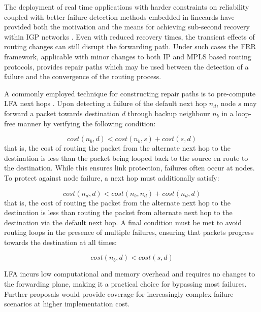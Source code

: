 The deployment of real time applications with harder constraints on reliability coupled with better failure detection methods embedded in linecards have provided both the motivation and the means for achieving sub-second recovery within \ac{IGP} networks \cite{Francois:2005p514}.
Even with reduced recovery times, the transient effects of routing changes can still disrupt the forwarding path.
Under such cases the \ac{FRR} framework, applicable with minor changes to both \ac{IP} \cite{Shand:2010p516} and \ac{MPLS} \cite{Pan:2005p517} based routing protocols, provides repair paths which may be used between the detection of a failure and the convergence of the routing process.

A commonly employed technique for constructing repair paths is to pre-compute \ac{LFA} next hops \cite{Torvi:2008p518}.
Upon detecting a failure of the default next hop $n_d$, node $s$ may forward a packet towards destination $d$ through backup neighbour $n_b$ in a loop-free manner by verifying the following condition:

\begin{equation}
cost \left (n_b, d \right) < cost \left(n_b, s \right) + cost \left(s, d \right) 
\label{eqn:linkprotection}
\end{equation}
that is, the cost of routing the packet from the alternate next hop to the destination is less than the packet being looped back to the source en route to the destination.
While this ensures link protection, failures often occur at nodes. To protect against node failure, a next hop must additionally satisfy:

\begin{equation}
cost \left (n_d, d \right) < cost \left(n_b, n_d \right) + cost \left(n_d, d \right) 
\label{eqn:nodeprotection}
\end{equation}
that is, the cost of routing the packet from the alternate next hop to the destination is less than routing the packet from alternate next hop to the destination via the default next hop.
A final condition must be met to avoid routing loops in the presence of multiple failures, ensuring that packets progress towards the destination at all times:

\begin{equation}
cost \left (n_b, d \right) < cost \left(s, d \right)
\label{eqn:downstream}
\end{equation}

\ac{LFA} incurs low computational and memory overhead and requires no changes to the forwarding plane, making it a practical choice for bypassing most failures.
Further proposals \cite{Atlas:2006p520,Bryant:2007p522,Shand:2011p521} would provide coverage for increasingly complex failure scenarios at higher implementation cost.

